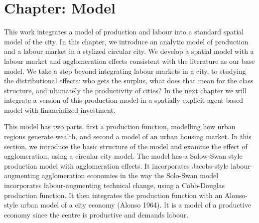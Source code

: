 \section{Chapter: Model}
\label{Sec:Model}



This work integrates a model of production and labour into a standard spatial model of the city. 
In this chapter, we introduce an analytic model of production and a labour market in a stylized circular city. 
We develop a spatial model with a labour market and agglomeration effects consistent with the literature as our base model. 
We take a step beyond integrating labour markets in a city, to studying the distributional effects: who gets the surplus, what does that mean for the class structure, and ultimately the productivity of cities? 
In the next chapter we will integrate a version of this production model in a spatially explicit agent based model with financialized investment. 

This model has two parts, first a production function, modelling how urban regions generate wealth, and second a model of an urban housing market. 
In this section, we introduce the basic structure of the model and examine the effect of agglomeration, using a circular city model.  
The model has a Solow-Swan style production model with agglomeration effects.  
It incorporates Jacobs-style labour-augmenting agglomeration economies 
in the way the Solo-Swan model incorporates labour-augmenting technical change, using a Cobb-Douglas production function. 
It then integrates the production function with an Alonso-style urban model of a city economy (Alonso 1964). 
It is a model of a productive economy since the centre is productive and demands labour.

